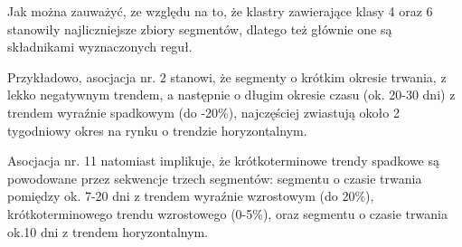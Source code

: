 \documentclass[polish, twoside, 12pt, a4paper]{article}
\theoremstyle{definition}
\theoremstyle{plain}
\theoremstyle{remark}
\begin{document}
Jak można zauważyć, ze względu na to, że klastry zawierające klasy 4 oraz 6 stanowiły najliczniejsze zbiory segmentów, dlatego też głównie one są składnikami wyznaczonych reguł.

Przykładowo, asocjacja nr. 2 stanowi, że segmenty o krótkim okresie trwania, z lekko negatywnym trendem, a następnie o długim okresie czasu (ok. 20-30 dni) z trendem wyraźnie 
spadkowym (do -20\%),  najczęściej zwiastują około 2 tygodniowy okres na rynku o trendzie horyzontalnym.

Asocjacja nr. 11 natomiast implikuje, że krótkoterminowe trendy spadkowe są powodowane przez sekwencje trzech segmentów: segmentu o czasie trwania pomiędzy ok. 7-20 dni z 
trendem wyraźnie wzrostowym (do 20\%), krótkoterminowego trendu wzrostowego (0-5\%), oraz segmentu o czasie trwania ok.10 dni z trendem horyzontalnym.
\end{document}
